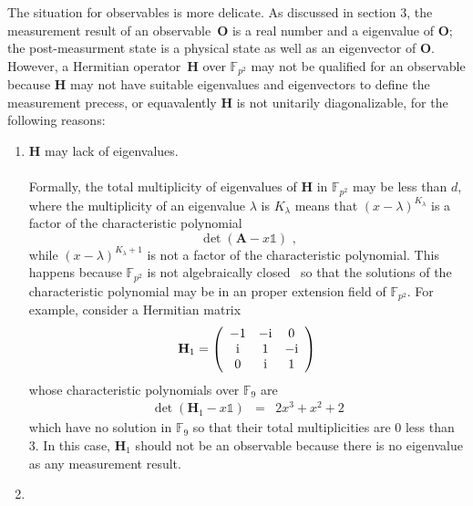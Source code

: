 \documentclass[english,12pt]{iopart}
\newcommand{\ff}[1]{\mathbb{F}_{#1}}
\newcommand{\yutsung}[1]{\fbox{\begin{minipage}{0.9\textwidth}\color{purple}{Yu-Tsung says: #1}\end{minipage}}}
\begin{document}
The situation for observables is more delicate. As discussed in section
3, the measurement result of an observable~$\mathbf{O}$ is a real
number and a eigenvalue of $\mathbf{O}$; the post-measurment state
is a physical state as well as an eigenvector of $\mathbf{O}$. However,
a Hermitian operator~$\mathbf{H}$ over $\ff{p^{2}}$ may not be
qualified for an observable because $\mathbf{H}$ may not have suitable
eigenvalues and eigenvectors to define the measurement precess, or
equavalently $\mathbf{H}$ is not unitarily diagonalizable, for the
following reasons:
\begin{enumerate}
\item \label{enu:eigenvalueCount}$\mathbf{H}$ may lack of eigenvalues.
\\
\yutsung{No eigenvalue is a problem, but how to clearly say why no
enough eigenvalue is a problem?}\\
Formally, the total multiplicity of eigenvalues of $\mathbf{H}$ in
$\ff{p^{2}}$ may be less than $d$, where the multiplicity of an
eigenvalue $\lambda$ is $K_{\lambda}$ means that $\left(x-\lambda\right)^{K_{\lambda}}$
is a factor of the characteristic polynomial 
\begin{equation}
\det\left(\mathbf{A}-x\mathds{1}\right)\textrm{ ,}\label{eq:characteristic}
\end{equation}
while $\left(x-\lambda\right)^{K_{\lambda}+1}$ is not a factor of
the characteristic polynomial. This happens because $\ff{p^{2}}$
is not algebraically closed~\cite{DummitFoote2004} so that the solutions
of the characteristic polynomial may be in an proper extension field
of $\ff{p^{2}}$. For example, consider a Hermitian matrix 
\[
\mathbf{H}_{1}=\left(\begin{array}{ccc}
-1 & -\mathrm{i} & 0\\
\mathrm{i} & 1 & -\mathrm{i}\\
0 & \mathrm{i} & 1
\end{array}\right)
\]
whose characteristic polynomials over $\ff{9}$ are
\begin{eqnarray*}
\det\left(\mathbf{H}_{1}-x\mathds{1}\right) & = & 2x^{3}+x^{2}+2
\end{eqnarray*}
which have no solution in $\ff{9}$ so that their total multiplicities
are 0 less than 3. In this case, $\mathbf{H}_{1}$ should not be an
observable because there is no eigenvalue as any measurement result. 
\item \label{enu:degeneracy}\yutsung{The same. How to say clearly why
no enough eigenvector is a problem?}\\

\end{enumerate}
\end{document}

